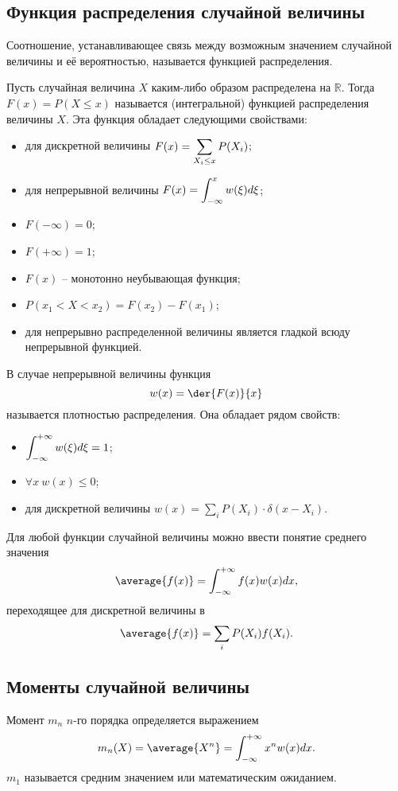 \subsection{Функция распределения случайной величины}

Соотношение, устанавливающее связь между возможным значением случайной величины
и её вероятностью, называется функцией распределения.

Пусть случайная величина \( X \) каким-либо образом распределена на
\( \mathbb{R} \). Тогда \( F(x) = P(X \le x) \) называется (интегральной)
функцией распределения величины \( X \). Эта функция обладает следующими
свойствами:
\begin{itemize}
    \item для дискретной величины \( \displaystyle F(x) = \sum_{X_i \le x}P(X_i) \);
    \item для непрерывной величины \( \displaystyle F(x) = \int_{-\infty}^x w(\xi)d\xi \);
    \item \( F(-\infty) = 0 \);
    \item \( F(+\infty) = 1 \);
    \item \( F(x) \) -- монотонно неубывающая функция;
    \item \( P(x_1 < X < x_2) = F(x_2) - F(x_1) \);
    \item для непрерывно распределенной величины является гладкой всюду
        непрерывной функцией.
\end{itemize}
В случае непрерывной величины функция
\[
    w(x) = \der{F(x)}{x}
\]
называется плотностью распределения. Она обладает рядом свойств:
\begin{itemize}
    \item \( \displaystyle \int_{-\infty}^{+\infty} w(\xi) d\xi = 1 \);
    \item \( \forall x\ w(x) \le 0 \);
    \item для дискретной величины
        \( w(x) = \sum_i P(X_i) \cdot \delta(x - X_i) \).
\end{itemize}

Для любой функции случайной величины можно ввести понятие среднего значения
\[
    \average{f(x)} = \int_{-\infty}^{+\infty}f(x)w(x)dx,
\]
переходящее для дискретной величины в
\[
    \average{f(x)} = \sum_i P(X_i)f(X_i).
\]

\subsection{Моменты случайной величины}

Момент \( m_n \) \( n \)-го порядка определяется выражением
\[
    m_n(X) = \average{X^n} = \int_{-\infty}^{+\infty} x^n w(x) dx.
\]
\( m_1 \) называется средним значением или математическим ожиданием.

